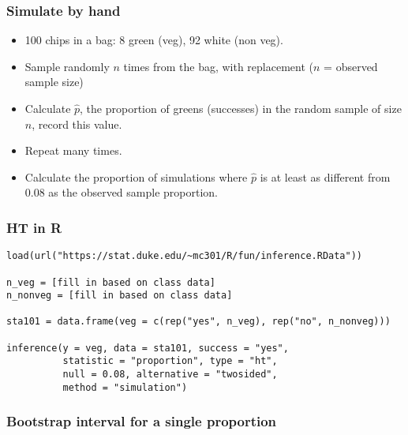 \documentclass[11pt,containsverbatim,handout,xcolor=xelatex,dvipsnames,table]{beamer}
\begin{document}

\begin{frame}
\frametitle{Simulate by hand}


\pause

\begin{itemize}
\item 100 chips in a bag: 8 green (veg), 92 white (non veg).
\pause
\item Sample randomly $n$ times from the bag, with replacement ($n$ = observed sample size)
\pause
\item Calculate $\hat{p}$, the proportion of greens (successes) in the random sample of size $n$, 
record this value.
\pause
\item Repeat many times.
\pause
\item Calculate the proportion of simulations where $\hat{p}$ is at least as different from 0.08 
as the observed sample proportion.
\end{itemize}

\end{frame}


\begin{frame}[fragile]
\frametitle{HT in R}

{\footnotesize
\begin{verbatim}
load(url("https://stat.duke.edu/~mc301/R/fun/inference.RData"))

n_veg = [fill in based on class data]
n_nonveg = [fill in based on class data]

sta101 = data.frame(veg = c(rep("yes", n_veg), rep("no", n_nonveg)))

inference(y = veg, data = sta101, success = "yes", 
          statistic = "proportion", type = "ht", 
          null = 0.08, alternative = "twosided", 
          method = "simulation")
\end{verbatim}
}

\end{frame}


\begin{frame}
\frametitle{Bootstrap interval for a single proportion}

\vfill


\vfill

\end{frame}
\end{document}
